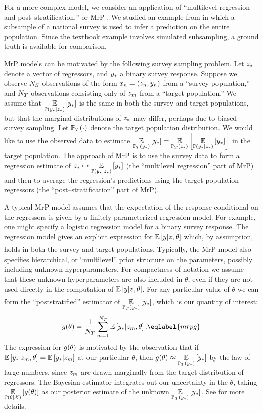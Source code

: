 For a more complex model, we consider an application of
``multilevel regression and post--stratification,'' or MrP 
\citep{park:2004:mrp}.  We studied an example from \citet{lopezmartin:2022:mrptutorial}
in which a subsample of a national survey is used to infer a prediction
on the entire population.  Since the textbook example involves simulated subsampling,
a ground truth is available for comparison.

MrP models can be motivated by the following survey sampling problem. Let $z_{*}$
denote a vector of regressors, and $y_{*}$ a binary survey response.  Suppose we
observe $N_{S}$ observations of the form $x_n = (z_n, y_n)$ from a
``survey population,'' and $N_{T}$ observations consisting only of $z_m$
from a ``target population.''  We assume that $\underset{\mathbb{P}(y_{*} \vert z_{*})}{\mathbb{E}}\left[y_{*}\right]$
is the same in both the survey and target populations, but that the marginal
distributions of $z_{*}$ may differ, perhaps due to biased survey sampling.  Let
$\mathbb{P}_T(\cdot)$ denote the target population distribution.  We would like to
use the observed data to estimate $\underset{\mathbb{P}_T(y_{*})}{\mathbb{E}}\left[y_{*}\right] =
\underset{\mathbb{P}_T(z_{*})}{\mathbb{E}}\left[\underset{\mathbb{P}(y_{*} \vert z_{*})}{\mathbb{E}}\left[y_{*}\right]\right]$ in the target
population.  The approach of MrP is to use the survey data to form a regression
estimate of $z_{*} \mapsto \underset{\mathbb{P}(y_{*} \vert z_{*})}{\mathbb{E}}\left[y_{*}\right]$ (the ``multilevel
regression'' part of MrP) and then to average the regression's predictions using
the target population regressors (the ``post--stratification'' part of MrP).

A typical MrP model assumes that the expectation of the response conditional on
the regressors is given by a finitely parameterized regression model.  For example,
one might specify a logistic regression model for a binary survey response.  The
regression model gives an explicit expression for $\underset{}{\mathbb{E}}\left[y | z, \theta\right]$
which, by assumption, holds in both the survey and target populations.
Typically, the MrP model also specifies hierarchical, or ``multilevel'' prior
structure on the parameters, possibly including unknown hyperparameters. For
compactness of notation we assume that these unknown hyperparameters are also
included in $\theta$, even if they are not used directly in the computation of
$\underset{}{\mathbb{E}}\left[y | z, \theta\right]$.  For any particular value of $\theta$ we can form
the ``poststratified'' estimator of $\underset{\mathbb{P}_T(y_{*})}{\mathbb{E}}\left[y_{*}\right]$, which is
our quantity of interest:
%
\begin{align}
    \g(\theta) = \frac{1}{N_{\target}} \sum_{m=1}^{N_{\target}} \expect{}{\yn | \z_m, \theta}.
    \eqlabel{mrpg}
\end{align}
%
The expression for $g(\theta)$ is motivated by the observation that if
$\underset{}{\mathbb{E}}\left[y_{*} | z_m, \theta\right] = \underset{}{\mathbb{E}}\left[y_{*} | z_m\right]$ at our particular
$\theta$, then $g(\theta) \approx \underset{\mathbb{P}_T(y_{*})}{\mathbb{E}}\left[y_{*}\right]$ by the law of
large numbers, since $z_m$ are drawn marginally from the target distribution of
regressors.  The Bayesian estimator integrates out our uncertainty in the
$\theta$, taking $\underset{\mathbb{P}(\theta | {\mathcal{X}})}{\mathbb{E}}\left[g(\theta)\right]$ as our posterior estimate of the
unknown $\underset{\mathbb{P}_T(y_{*})}{\mathbb{E}}\left[y_{*}\right]$.  See
\citet{park:2004:mrp,lopezmartin:2022:mrptutorial} for more details.

